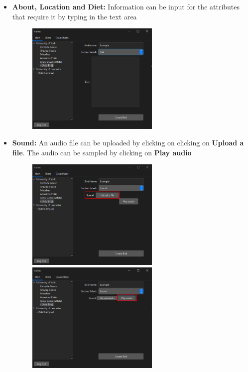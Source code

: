 \begin{enumerate}
\begin{itemize}
        \item \textbf{About, Location and Diet:}
        Information can be input for the attributes that require it by typing in the text area
        \begin{figure}[H]
            \centering
            \includegraphics[width=0.6\textwidth]{MainTab/AddBird/addBirdText.PNG}
        \end{figure}

        \item \textbf{Sound:}
        An audio file can be uploaded by clicking on clicking on \textbf{Upload a file}. The audio can be sampled by clicking on \textbf{Play audio}
        \begin{figure}[H]
            \centering
            \includegraphics[width=0.6\textwidth]{MainTab/AddBird/addBirdAudio.PNG}
            \includegraphics[width=0.6\textwidth]{MainTab/AddBird/addBirdAudioSelected.PNG}
        \end{figure}


\end{itemize}
\end{enumerate}

